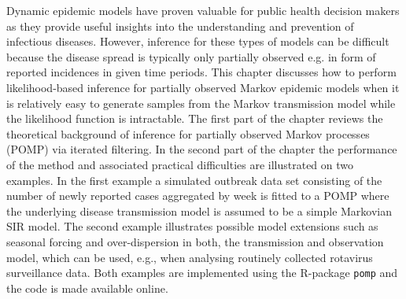 \small{
\noindent 
Dynamic epidemic models have proven valuable for public health decision makers as they provide useful insights into the understanding and prevention of infectious diseases. However, inference for these types of models can be difficult because the disease spread is typically only partially observed e.g. in form of reported incidences in given time periods. This chapter discusses how to perform likelihood-based inference for partially observed Markov epidemic models when it is relatively easy to generate samples from the Markov transmission model while the likelihood function is intractable. The first part of the chapter reviews the theoretical background of inference for partially observed Markov processes (POMP) via iterated filtering. In the second part of the chapter the performance of the method and associated practical difficulties are illustrated on two examples. In the first example a simulated outbreak data set consisting of the number of newly reported cases aggregated by week is fitted to a POMP where the underlying disease transmission model is assumed to be a simple Markovian SIR model. The second example illustrates possible model extensions such as seasonal forcing and over-dispersion in both, the transmission and observation model, which can be used, e.g., when analysing routinely collected rotavirus surveillance data. Both examples are implemented using the R-package \texttt{pomp}  \citep{kingNgu} and the code is made available online. 
}
